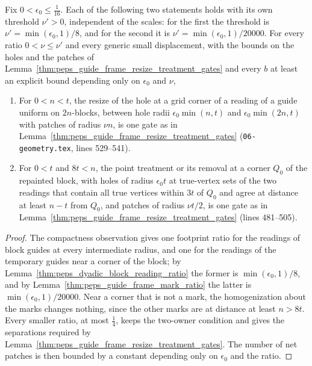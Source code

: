 \begin{lemma}
    \label{thm:peps_guide_frame_reading_gates}
    \leanok
    Fix $0<\epsilon_0\le\tfrac1{16}$. Each of the following two statements
    holds with its own threshold $\nu'>0$, independent of the scales: for the
    first the threshold is $\nu'=\min(\epsilon_0,1)/8$, and for the second it
    is $\nu'=\min(\epsilon_0,1)/20000$. For
    every ratio $0<\nu\le\nu'$ and every generic small displacement, with
    the bounds on the holes and the patches of
    Lemma~\ref{thm:peps_guide_frame_resize_treatment_gates} and every $b$
    at least an explicit bound depending only on $\epsilon_0$ and $\nu$,
    \begin{enumerate}
        \item For $0<n<t$, the resize of the hole at a grid corner of a reading
              of a guide uniform on $2n$-blocks, between hole radii
              $\epsilon_0\min(n,t)$ and $\epsilon_0\min(2n,t)$ with patches of
              radius $\nu n$, is one gate as in
              Lemma~\ref{thm:peps_guide_frame_resize_treatment_gates}
              (\texttt{06-geometry.tex}, lines 529--541).
        \item For $0<t$ and $8t<n$, the point treatment or its removal at a
              corner $Q_0$ of the repainted block, with holes of radius $\epsilon_0t$
              at true-vertex sets of the two readings that contain all true vertices
              within $3t$ of $Q_0$ and agree at distance at least $n-t$ from
              $Q_0$, and patches of radius $\nu t/2$, is one gate as in
              Lemma~\ref{thm:peps_guide_frame_resize_treatment_gates}
              (lines 481--505).
    \end{enumerate}
\end{lemma}

\begin{proof}\leanok
    The compactness observation gives one footprint ratio for the readings of
    block guides at every intermediate radius, and one for the readings of the
    temporary guides near a corner of the block; by
    Lemma~\ref{thm:peps_dyadic_block_reading_ratio} the former is
    $\min(\epsilon_0,1)/8$, and by
    Lemma~\ref{thm:peps_guide_frame_mark_ratio} the latter is
    $\min(\epsilon_0,1)/20000$. Near a corner that is not a
    mark, the homogenization about the marks changes nothing, since the other
    marks are at distance at least $n>8t$. Every smaller ratio, at most
    $\tfrac14$, keeps the two-owner condition and gives the separations required
    by Lemma~\ref{thm:peps_guide_frame_resize_treatment_gates}. The number of
    net patches is then bounded by a constant depending only on $\epsilon_0$
    and the ratio.
\end{proof}


